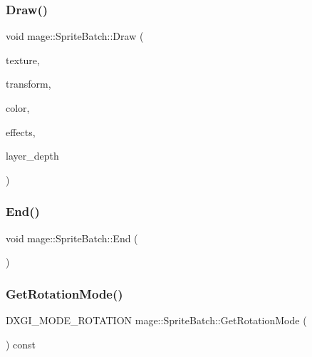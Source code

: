 \hypertarget{classmage_1_1_sprite_batch_aa877dd94078b932b94c9f27e741dfa41}{}\label{classmage_1_1_sprite_batch_aa877dd94078b932b94c9f27e741dfa41} 
\subsubsection{\texorpdfstring{Draw()}{Draw()}}
{\footnotesize\ttfamily void mage\+::\+Sprite\+Batch\+::\+Draw (\begin{DoxyParamCaption}\item[{I\+D3\+D11\+Shader\+Resource\+View $\ast$}]{texture,  }\item[{const \hyperlink{structmage_1_1_sprite_transform}{Sprite\+Transform} \&}]{transform,  }\item[{X\+M\+V\+E\+C\+T\+OR}]{color,  }\item[{\hyperlink{namespacemage_a06ff9ac76b1e0636cc8949c3f0d4ac46}{Sprite\+Effects}}]{effects,  }\item[{float}]{layer\+\_\+depth }\end{DoxyParamCaption})}

\hypertarget{classmage_1_1_sprite_batch_a9764372bb18b1c24a4a2f64ab0649569}{}\label{classmage_1_1_sprite_batch_a9764372bb18b1c24a4a2f64ab0649569} 
\subsubsection{\texorpdfstring{End()}{End()}}
{\footnotesize\ttfamily void mage\+::\+Sprite\+Batch\+::\+End (\begin{DoxyParamCaption}{ }\end{DoxyParamCaption})}

\hypertarget{classmage_1_1_sprite_batch_ade698c44432d175ca55a4545b9adae85}{}\label{classmage_1_1_sprite_batch_ade698c44432d175ca55a4545b9adae85} 
\subsubsection{\texorpdfstring{Get\+Rotation\+Mode()}{GetRotationMode()}}
{\footnotesize\ttfamily D\+X\+G\+I\+\_\+\+M\+O\+D\+E\+\_\+\+R\+O\+T\+A\+T\+I\+ON mage\+::\+Sprite\+Batch\+::\+Get\+Rotation\+Mode (\begin{DoxyParamCaption}{ }\end{DoxyParamCaption}) const}

